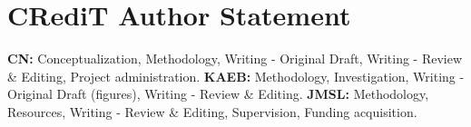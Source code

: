 \section*{CRediT Author Statement}

    \textbf{CN:} Conceptualization, Methodology, Writing - Original Draft, Writing -  Review  \&
    Editing,  Project  administration.  \textbf{KAEB:}  Methodology,  Investigation,  Writing  -
    Original  Draft  (figures),  Writing  -  Review  \&  Editing.  \textbf{JMSL:}   Methodology,
    Resources, Writing - Review \& Editing, Supervision, Funding acquisition.



